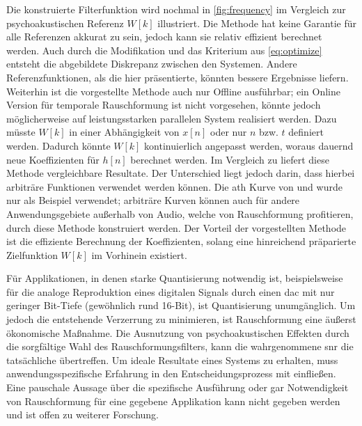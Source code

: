 Die konstruierte Filterfunktion wird nochmal in \autoref{fig:frequency} im Vergleich zur psychoakustischen Referenz $W[k]$ illustriert.
Die Methode hat keine Garantie für alle Referenzen akkurat zu sein, jedoch kann sie relativ effizient berechnet werden.
Auch durch die Modifikation und das Kriterium aus \autoref{eq:optimize} entsteht die abgebildete Diskrepanz zwischen den Systemen.
Andere Referenzfunktionen, als die hier präsentierte, könnten bessere Ergebnisse liefern.
Weiterhin ist die vorgestellte Methode auch nur Offline ausführbar; ein Online Version für temporale Rauschformung ist nicht vorgesehen, könnte jedoch möglicherweise auf leistungsstarken parallelen System realisiert werden.
Dazu müsste $W[k]$ in einer Abhängigkeit von $x[n]$ oder nur $n$ bzw. $t$ definiert werden.
Dadurch könnte $W[k]$ kontinuierlich angepasst werden, woraus dauernd neue Koeffizienten für $h[n]$ berechnet werden.
Im Vergleich zu \citeauthor{noise-shaping} liefert diese Methode vergleichbare Resultate.
Der Unterschied liegt jedoch darin, dass hierbei arbiträre Funktionen verwendet werden können.
Die \gls{ath} Kurve von  und \citeauthor{iso226matlab} wurde nur als Beispiel verwendet;
arbiträre Kurven können auch für andere Anwendungsgebiete außerhalb von Audio, welche von Rauschformung profitieren, durch diese Methode konstruiert werden.
Der Vorteil der vorgestellten Methode ist die effiziente Berechnung der Koeffizienten, solang eine hinreichend präparierte Zielfunktion $W[k]$ im Vorhinein existiert.

Für Applikationen, in denen starke Quantisierung notwendig ist, beispielsweise für die analoge Reproduktion eines digitalen Signals durch einen \gls{dac} mit nur geringer Bit-Tiefe (gewöhnlich rund 16-Bit), ist Quantisierung unumgänglich.
Um jedoch die entstehende Verzerrung zu minimieren, ist Rauschformung eine äußerst ökonomische Maßnahme.
Die Ausnutzung von psychoakustischen Effekten durch die sorgfältige Wahl des Rauschformungsfilters, kann die wahrgenommene \gls{snr} die tatsächliche übertreffen.
Um ideale Resultate eines Systems zu erhalten, muss anwendungsspezifische Erfahrung in den Entscheidungsprozess mit einfließen.
Eine pauschale Aussage über die spezifische Ausführung oder gar Notwendigkeit von Rauschformung für eine gegebene Applikation kann nicht gegeben werden und ist offen zu weiterer Forschung.

